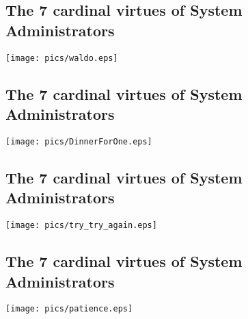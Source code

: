 \documentclass[xga]{xdvislides}
\begin{document}
%
\subsection{The 7 cardinal virtues of System Administrators}
\vspace*{\fill}
\begin{center}
	\texttt{[image: pics/waldo.eps]}
\end{center}
\vspace*{\fill}

\subsection{The 7 cardinal virtues of System Administrators}
\vspace*{\fill}
\begin{center}
	\texttt{[image: pics/DinnerForOne.eps]}
\end{center}
\vspace*{\fill}

\subsection{The 7 cardinal virtues of System Administrators}
\vspace*{\fill}
\begin{center}
	\texttt{[image: pics/try\_try\_again.eps]}
\end{center}
\vspace*{\fill}

\subsection{The 7 cardinal virtues of System Administrators}
\vspace*{\fill}
\begin{center}
	\texttt{[image: pics/patience.eps]}
\end{center}
\vspace*{\fill}
\end{document}
